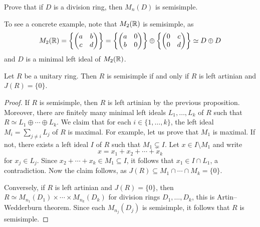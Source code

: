 
\begin{exercise}
\label{xca:M_n(D)_semisimple}
    Prove that if $D$ is a division ring, then 
    $M_n(D)$ is semisimple. 
\end{exercise}

To see a concrete example, note that  
$M_2(\mathbb{R})$ is semisimple, as  
\[
M_2(\mathbb{R})=\left\{\begin{pmatrix}
a&b\\
c&d
\end{pmatrix}\right\}
=
\left\{\begin{pmatrix}
a&0\\
b&0
\end{pmatrix}\right\}
\oplus
\left\{\begin{pmatrix}
0&c\\
0&d
\end{pmatrix}\right\}\simeq D\oplus D
\]
and $D$ is a minimal left ideal of $M_2(\mathbb{R})$. 

\begin{theorem}
	\label{thm:SSartin=J}
	Let $R$ be a unitary ring. Then $R$ is semisimple if and only if 
	$R$ is left artinian and $J(R)=\{0\}$.
\end{theorem}

\begin{proof}
    If $R$ is semisimple, then $R$ is left artinian by the previous proposition. 
    Moreover, 
    there are finitely many 
    minimal left ideals $L_1,\dots,L_k$ of $R$ 
    such that $R\simeq L_1\oplus\cdots\oplus L_k$. We claim that
    for each $i\in\{1,\dots,k\}$, the left ideal
    $M_i=\sum_{j\ne i}L_j$ of $R$ is maximal. For example, let us prove
    that $M_1$ is maximal. If not, there exists a left ideal $I$ of $R$ 
    such that $M_1\subsetneq I$. Let $x\in I\setminus M_1$ and write 
    \[
    x=x_1+x_2+\cdots+x_k
    \]
    for $x_j\in L_j$. Since $x_2+\cdots+x_k\in M_1\subseteq I$, 
    it follows that $x_1\in I\cap L_1$, a contradiction. Now the claim follows, as
    $J(R)\subseteq M_1\cap\cdots\cap M_k=\{0\}$. 
    
    Conversely, if $R$ is left artinian and $J(R)=\{0\}$, then
    $R\simeq M_{n_1}(D_1)\times\cdots\times M_{n_k}(D_k)$ 
    for division rings $D_1,\dots,D_k$, this is Artin--Wedderburn theorem. 
    Since each $M_{n_j}(D_j)$ 
    is semisimple, it follows that $R$ is semisimple. 
\end{proof}

